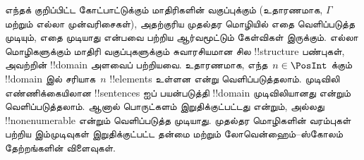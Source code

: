 \documentclass[../../../include/open-logic-section]{subfiles}
\begin{document}
எந்தக் குறிப்பிட்ட கோட்பாட்டுக்கும் மாதிரிகளின் வகுப்புக்கும் (உதாரணமாக,
$\Gamma$ மற்றும் எல்லா முன்வரிசைகள்), அதற்குரிய முதல்தர மொழியில் எதை
வெளிப்படுத்த முடியும், எதை முடியாது என்பவை பற்றிய ஆர்வமூட்டும் கேள்விகள்
இருக்கும். எல்லா மொழிகளுக்கும் மாதிரி வகுப்புகளுக்கும் சுவாரசியமான சில
!!{structure} பண்புகள், அவற்றின் !!{domain} அளவைப் பற்றியவை. உதாரணமாக,
எந்த~$n \in \PosInt$ க்கும் !!{domain} இல் சரியாக~$n$ !!{element}s உள்ளன
என்று வெளிப்படுத்தலாம். முடிவிலி எண்ணிக்கையிலான !!{sentence}s ஐப் பயன்படுத்தி
!!{domain} முடிவிலியானது என்றும் வெளிப்படுத்தலாம். ஆனால் பொருட்களம்
இறுதிக்குட்பட்டது என்றும், அல்லது !!{nonenumerable} என்றும் வெளிப்படுத்த
முடியாது. முதல்தர மொழிகளின் வரம்புகள் பற்றிய இம்முடிவுகள் இறுதிக்குட்பட்ட
தன்மை மற்றும் லோவென்ஹைம்--ஸ்கோலம் தேற்றங்களின் விளைவுகள்.
\end{document}
